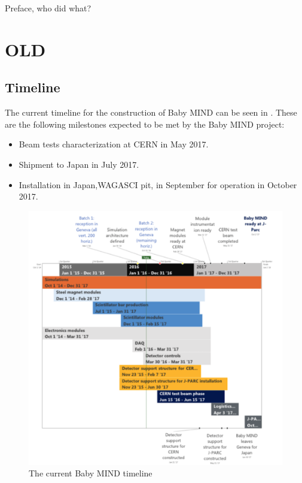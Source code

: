 Preface, who did what?


\fi

\section{OLD}
\subsection{Timeline}
The current timeline for the construction of Baby MIND can be seen in .
These are the following milestones expected to be met by the Baby MIND project:
\begin{itemize}
\item Beam tests characterization at CERN in May 2017.
\item Shipment to Japan in July 2017.
\item Installation in Japan,WAGASCI pit, in September for operation in October 2017.
\end{itemize}

\begin{figure}[h!]
\centering
\includegraphics[width=\textwidth]{figures/timeline.png}
\caption{The current Baby MIND timeline}
\label{fig:timeline}
\end{figure}


